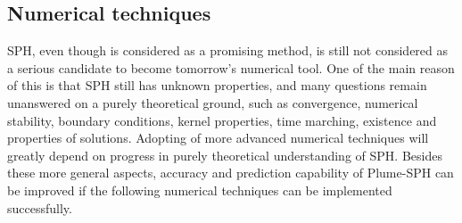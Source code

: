 \subsection{Numerical techniques}
SPH, even though is considered as a promising method, is still not considered as a serious candidate to become tomorrow's numerical tool. One of the main reason of this is that SPH still has unknown properties, and many questions remain unanswered on a purely theoretical ground, such as convergence, numerical stability, boundary conditions, kernel properties, time marching, existence and properties of solutions.
Adopting of more advanced numerical techniques will greatly depend on progress in purely theoretical understanding of SPH. 
Besides these more general aspects, accuracy and prediction capability of Plume-SPH can be improved if the following numerical techniques can be implemented successfully. 
